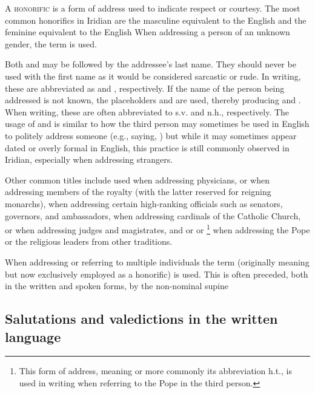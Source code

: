 A {\scshape honorific} is a form of address used to indicate respect or
courtesy. The most common honorifics in Iridian are the masculine 
equivalent to the English  and the feminine 
equivalent to the English  When addressing a person of an
unknown gender, the term  is used.

Both  and  may be followed by the addressee's last name. They
should never be used with the first name as it would be considered sarcastic or
rude. In writing, these are abbreviated as  and , respectively.
If the name of the person being addressed is not known, the placeholders
 and  are used, thereby producing  and . When writing, these are often abbreviated to {\sc
s.v.} and {\sc n.h.}, respectively. The usage of  and  is similar to how the third person may sometimes be used in
English to politely address someone (e.g., saying, ) but while it may sometimes appear dated or overly formal in
English, this practice is still commonly observed in Iridian,
especially when addressing strangers.

Other common titles include  used when addressing physicians,
 or  when addressing members of the royalty (with
the latter reserved for reigning monarchs),  when addressing
certain high-ranking officials such as senators, governors, and ambassadors,
 when addressing cardinals of the Catholic Church,  or
 when addressing judges and magistrates, and  or
 or \footnote{This form of address, meaning
 or more commonly its abbreviation {\sc h.t.}, is used in
writing when referring to the Pope in the third person.} when addressing the
Pope or the religious leaders from other traditions.

When addressing or referring to multiple individuals the term 
(originally meaning  but now exclusively employed as a honorific) is
used. This is often preceded, both in the written and spoken forms, by the
non-nominal supine 

\subsection{Salutations and valedictions in the written language}

